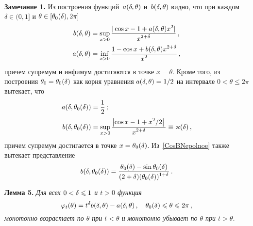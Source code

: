 \begin{multicols}{2}
\noindent
\textbf{Замечание 1.} Из построения функций~$a(\delta,\theta)$ и~$b(\delta,\theta)$ видно, что при
каждом ${\delta\in(0,1]}$ и ${\theta\in[\theta_0(\delta),2\pi]}$
\begin{align*}
b(\delta,\theta)&=\sup_{x>0}\displaystyle\frac{\displaystyle |\cos x-1+a(\delta,\theta)x^2|\mathstrut}{\displaystyle x^{2+\delta}\mathstrut}\,,\\
a(\delta,\theta)&=\inf_{x>0}\displaystyle\frac{\displaystyle 1-\cos x+b(\delta,\theta)x^{2+\delta}\mathstrut}{\displaystyle x^2\mathstrut}\,,
\end{align*}
причем супремум и инфимум достигаются в точке $x=\theta$. Кроме
того, из построения  $\theta_0=\theta_0(\delta)$ как корня уравнения
$a(\delta,\theta)=1/2$ на интервале $0<\theta\le 2\pi$ вытекает, что
\begin{align*}
a(\delta,\theta_0(\delta))&=\displaystyle\frac{\displaystyle 1\mathstrut}{\displaystyle 2\mathstrut}\,;\\
b(\delta,\theta_0(\delta))&=\sup_{x>0}\displaystyle\frac{\displaystyle \left|\cos
x-1+x^2/2\right|\mathstrut}{\displaystyle x^{2+\delta}\mathstrut}\equiv \varkappa(\delta)\,,
\end{align*}
причем супремум достигается в точке $x=\theta_0(\delta)$.
Из~\eqref{CosBNepolnoe} также вытекает представление
$$
b(\delta,\theta_0(\delta))=
\displaystyle\frac{\displaystyle \theta_0(\delta)-\sin\theta_0(\delta)\mathstrut}{\displaystyle (2+\delta)(\theta_0(\delta))^{1+\delta}\mathstrut}\,.
$$


\medskip

\noindent
\textbf{Лемма 5.} \textit{Для всех $0<\delta\leqslant1$ и $t>0$ функция}
\begin{equation*}
\varphi_{t}(\theta)= t^{\delta}b(\delta,\theta)-a(\delta,\theta)\,,\quad
\theta_0(\delta)\leqslant\theta\leqslant2\pi\,,
\end{equation*}
\textit{монотонно возрастает по $\theta$ при $t<\theta$ и монотонно убывает
по $\theta$ при $t>\theta$.}
\medskip


\end{multicols}
